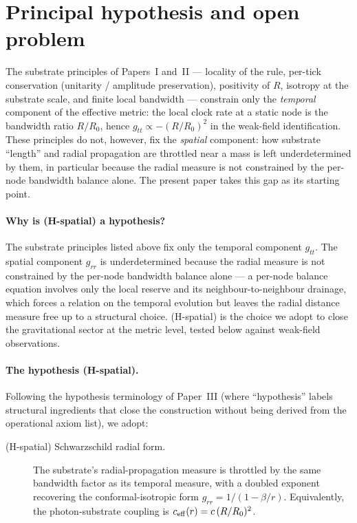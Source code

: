 \documentclass[11pt,a4paper]{article}
\begin{document}
\section{Principal hypothesis and open problem}
\label{sec:hypothesis}

The substrate principles of Papers~I and~II --- locality of
the rule, per-tick conservation (unitarity / amplitude
preservation), positivity of $R$, isotropy at the substrate
scale, and finite local bandwidth --- constrain only the
\emph{temporal} component of the effective metric: the local
clock rate at a static node is the bandwidth ratio $R/R_0$,
hence $g_{tt} \propto -(R/R_0)^2$ in the weak-field
identification. These principles do not, however, fix the
\emph{spatial} component: how substrate ``length'' and radial
propagation are throttled near a mass is left underdetermined
by them, in particular because the radial measure is not
constrained by the per-node bandwidth balance alone. The
present paper takes this gap as its starting point.

\paragraph{Why is (H-spatial) a hypothesis?}
The substrate principles listed above fix only the temporal
component $g_{tt}$. The spatial component $g_{rr}$ is
underdetermined because the radial measure is not constrained
by the per-node bandwidth balance alone --- a per-node
balance equation involves only the local reserve and its
neighbour-to-neighbour drainage, which forces a relation on
the temporal evolution but leaves the radial distance measure
free up to a structural choice. (H-spatial) is the choice we
adopt to close the gravitational sector at the metric level,
tested below against weak-field observations.

\paragraph{The hypothesis (H-spatial).}
Following the hypothesis terminology of Paper~III (where
``hypothesis'' labels structural ingredients that close the
construction without being derived from the operational
axiom list), we adopt:

\begin{description}
\item[(H-spatial) Schwarzschild radial form.]
The substrate's radial-propagation measure is throttled by the
same bandwidth factor as its temporal measure, with a doubled
exponent recovering the conformal-isotropic form
$g_{rr} = 1/(1 - \beta/r)$. Equivalently, the photon-substrate
coupling is $c_{\rm eff}(r) = c\,(R/R_0)^2$.
\end{description}
\end{document}
